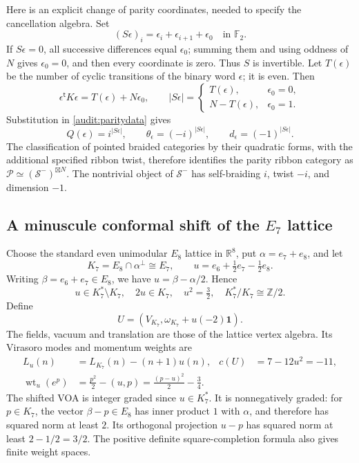 \documentclass[11pt,a4paper]{article}
\numberwithin{equation}{section}
\theoremstyle{definition}\newtheorem{definition}[theorem]{Definition}
\theoremstyle{remark}\newtheorem{remark}[theorem]{Remark}
\begin{document}
Here is an explicit change of parity coordinates, needed to specify
the cancellation algebra. Set
\[
 (S\epsilon)_i=\epsilon_i+\epsilon_{i+1}+\epsilon_0
 \quad\text{in }\mathbb F_2.
\]
If $S\epsilon=0$, all successive differences equal $\epsilon_0$;
summing them and using oddness of $N$ gives $\epsilon_0=0$, and
then every coordinate is zero. Thus $S$ is invertible.
Let $T(\epsilon)$ be the number of cyclic transitions of the binary
word $\epsilon$; it is even. Then
\[
 \epsilon^{\mathsf t}K\epsilon=T(\epsilon)+N\epsilon_0,
 \qquad |S\epsilon|=
 \begin{cases}
 T(\epsilon),&\epsilon_0=0,\\
 N-T(\epsilon),&\epsilon_0=1.
 \end{cases}
\]
Substitution in \eqref{audit:paritydata} gives
\begin{equation}\label{audit:semioncoords}
 Q(\epsilon)=i^{|S\epsilon|},\qquad
 \theta_\epsilon=(-i)^{|S\epsilon|},\qquad
 d_\epsilon=(-1)^{|S\epsilon|}.
\end{equation}
The classification of pointed braided categories by their quadratic
forms, with the additional specified ribbon twist, therefore identifies
the parity ribbon category as
$\mathcal P\simeq(\mathcal S^-)^{\boxtimes N}$.
The nontrivial object of $\mathcal S^-$ has self-braiding $i$,
twist $-i$, and dimension $-1$.

\subsection{A minuscule conformal shift of the \texorpdfstring{$E_7$}{E7} lattice}

Choose the standard even unimodular $E_8$ lattice in $\mathbb R^8$,
put $\alpha=e_7+e_8$, and let
\[
 K_7=E_8\cap\alpha^\perp\cong E_7,\qquad
 u=e_6+\tfrac12e_7-\tfrac12e_8.
\]
Writing $\beta=e_6+e_7\in E_8$, we have $u=\beta-\alpha/2$.
Hence
\[
 u\in K_7^*\setminus K_7,\quad 2u\in K_7,
 \quad u^2=\tfrac32,
 \quad K_7^*/K_7\cong\mathbb Z/2.
\]
Define
\[
 U=(V_{K_7},\omega_{K_7}+u(-2)\mathbf1).
\]
The fields, vacuum and translation are those of the lattice vertex
algebra. Its Virasoro modes and momentum weights are
\begin{align*}
 L_u(n)&=L_{K_7}(n)-(n+1)u(n),&
 c(U)&=7-12u^2=-11,\\
 \operatorname{wt}_u(e^p)
 &=\frac{p^2}{2}-(u,p)
 =\frac{(p-u)^2}{2}-\frac34.
\end{align*}
The shifted VOA is integer graded since $u\in K_7^*$.
It is nonnegatively graded: for $p\in K_7$, the vector
$\beta-p\in E_8$ has inner product $1$ with $\alpha$, and therefore
has squared norm at least $2$. Its orthogonal projection $u-p$ has
squared norm at least $2-1/2=3/2$.
The positive definite square-completion formula also gives finite
weight spaces.
\end{document}
